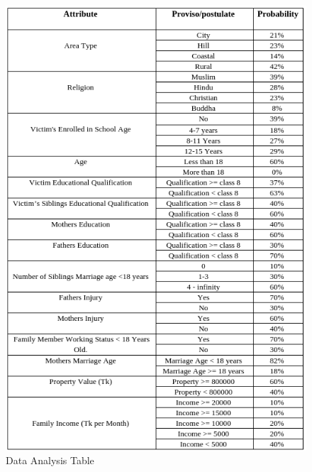 \documentclass{article}
\begin{document}
        \pagebreak\begin{figure}[!htb]
            \includegraphics[width=1\textwidth]{Images/table1.png}
            \caption{Data Analysis Table}
        \end{figure} 
 
\end{document}
